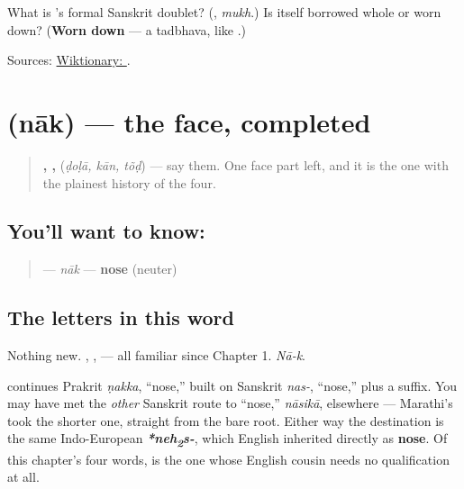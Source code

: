 \begin{tcolorbox}[breakable,colback=teal!4,colframe=teal!35!black,title={Before you move on}]
What is \textbf{}'s formal Sanskrit doublet? (\textbf{}, \emph{mukh}.) Is \textbf{} itself borrowed whole or worn down? (\textbf{Worn down} — a tadbhava, like \textbf{}.)

Sources: \href{https://en.wiktionary.org/wiki/\%E0\%A4\%A4\%E0\%A5\%8B\%E0\%A4\%82\%E0\%A4\%A1}{Wiktionary: }.
\end{tcolorbox}
\section[\texorpdfstring{\mr{नाक} (nāk)}{नाक (nāk)}]{ (nāk) — the face, completed}

\label{lesson:MR-C12-naak}



\begin{quote}
\textbf{, , } (\emph{ḍoḷā, kān, tõḍ}) — say them. One face part left, and it is the one with the plainest history of the four.
\end{quote}

\subsection*{You'll want to know: }
\begin{quote}
\textbf{} — \emph{nāk} — \textbf{nose} (neuter)
\end{quote}

\subsection*{The letters in this word}
Nothing new. \textbf{}, \textbf{}, \textbf{} — all familiar since Chapter 1. \emph{Nā-k}.

\begin{cousinweb}
\textbf{} continues Prakrit \textbf{} \emph{ṇakka}, \textquotedblleft{}nose,\textquotedblright{} built on Sanskrit \textbf{} \emph{nas-}, \textquotedblleft{}nose,\textquotedblright{} plus a suffix. You may have met the \emph{other} Sanskrit route to \textquotedblleft{}nose,\textquotedblright{} \textbf{} \emph{nāsikā}, elsewhere — Marathi's \textbf{} took the shorter one, straight from the bare root. Either way the destination is the same Indo-European \emph{\textbf{*neh\textsubscript{2}s-}}, which English inherited directly as \textbf{nose}. Of this chapter's four words, \textbf{} is the one whose English cousin needs no qualification at all.
\end{cousinweb}

